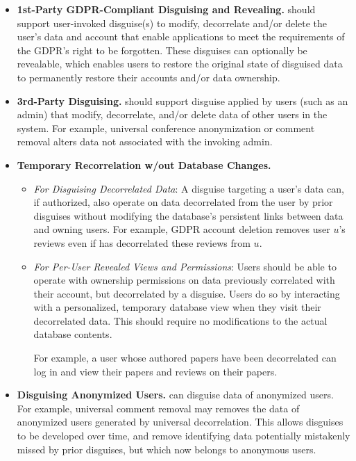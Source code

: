 \begin{itemize}
    \item\textbf{1st-Party GDPR-Compliant Disguising and Revealing.}
\sys should support user-invoked disguise(s) to modify, decorrelate and/or delete the user's data and
account that enable applications to meet the requirements of the GDPR's right to be
forgotten.
%
These disguises can optionally be revealable, which enables users to restore the original state of
        disguised data to \eg permanently restore their accounts and/or data ownership.

\item\textbf{3rd-Party Disguising.}
\sys should support disguise applied by users (such as an admin) that modify, decorrelate, and/or delete
    data of other users in the system. For example, universal conference anonymization or
    comment removal alters data not associated with the invoking admin.

\item\textbf{Temporary Recorrelation w/out Database Changes.}
    \begin{itemize}
        \item \emph{For Disguising Decorrelated Data}: 
        A disguise targeting a user's data can, if authorized, also operate on data decorrelated
            from the user by prior disguises without modifying the database's persistent links
            between data and owning users. For example, GDPR account deletion removes user $u$'s
            reviews even if \sys has decorrelated these reviews from $u$.

    \item \emph{For Per-User Revealed Views and Permissions}:
            Users should be able to operate with ownership permissions on data previously correlated
            with their account, but decorrelated by a disguise. Users do so by interacting with a
            personalized, temporary database view when they visit their decorrelated data. This
            should require no modifications to the actual database contents.

            For example, a user whose authored papers have been decorrelated can log in and view
            their papers and reviews on their papers.
\end{itemize}

\item\textbf{Disguising Anonymized Users.}
\sys can disguise data of anonymized users. For example, universal comment removal may removes the
data of anonymized users generated by universal decorrelation.  This allows disguises to be
developed over time, and remove identifying data potentially mistakenly missed by prior
disguises, but which now belongs to anonymous users.
\end{itemize}

